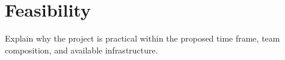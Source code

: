 \section{Feasibility}

Explain why the project is practical within the proposed time frame,
team composition, and available infrastructure.
